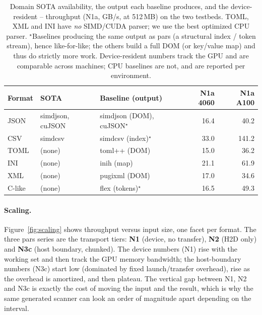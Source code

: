 \begin{table}[t]
\centering\small
\caption{Domain SOTA availability, the output each baseline produces, and the
device-resident \Rone--\Rfive{} throughput (N1a, GB/s, at 512\,MB) on the two
testbeds.  TOML, XML and INI have \emph{no} SIMD/CUDA parser; we use the best
optimized CPU parser.  $^\star$Baselines producing the same output as pars
(a structural index / token stream), hence like-for-like; the others build a
full DOM (or key/value map) and thus do strictly more work.  Device-resident
numbers track the GPU and are comparable across machines; CPU baselines are
not, and are reported per environment.}
\label{tab:sota}
\begin{tabular}{@{}lllrr@{}}
\toprule
Format & SOTA & Baseline (output) & N1a 4060 & N1a A100 \\
\midrule
JSON & simdjson, cuJSON & simdjson (DOM), cuJSON$^\star$ & 16.4 & 40.2 \\
CSV  & simdcsv           & simdcsv (index)$^\star$      & 33.0 & 141.2 \\
TOML & (none)            & toml++ (DOM)                 & 15.0 & 36.2 \\
INI  & (none)            & inih (map)                   & 21.1 & 61.9 \\
XML  & (none)            & pugixml (DOM)                & 17.0 & 34.6 \\
C-like & (none)          & flex (tokens)$^\star$        & 16.5 & 49.3 \\
\bottomrule
\end{tabular}
\end{table}

\paragraph{Scaling.}
Figure~\ref{fig:scaling} shows throughput versus input size, one facet per
format.  The three pars series are the transport tiers: \textbf{N1} (device,
no transfer), \textbf{N2} (H2D only) and \textbf{N3c} (host boundary, chunked).
The device numbers (N1) rise with the working set and then track the GPU memory
bandwidth; the host-boundary numbers (N3c) start low (dominated by fixed
launch/transfer overhead), rise as the overhead is amortized, and then plateau.
The vertical gap between N1, N2 and N3c is exactly the cost of moving the input
and the result, which is why the same generated scanner can look an order of
magnitude apart depending on the interval.


